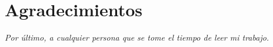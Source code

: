 \chapter*{Agradecimientos}

\textit{Por último, a cualquier persona que se tome el tiempo de leer mi trabajo. }
\afterpage{\null\newpage}
